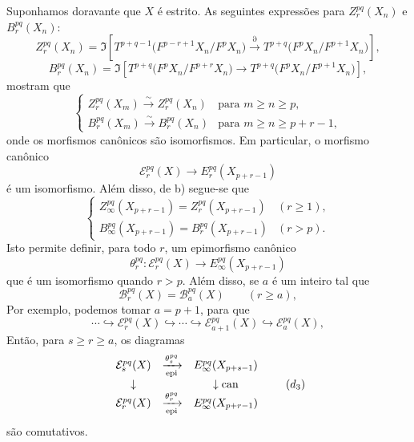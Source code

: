 Suponhamos doravante que \(X\) é estrito. As seguintes expressões para \(Z_r^{pq}(X_n)\) e \(B_r^{pq}(X_n)\):
\[
Z_r^{pq}(X_n)=
\Im\!\left[
T^{p+q-1}\bigl(F^{p-r+1}X_n/F^pX_n\bigr)
\xrightarrow{\partial}
T^{p+q}\bigl(F^pX_n/F^{p+1}X_n\bigr)
\right],
\]
\[
B_r^{pq}(X_n)=
\Im\!\left[
T^{p+q}\bigl(F^pX_n/F^{p+r}X_n\bigr)
\longrightarrow
T^{p+q}\bigl(F^pX_n/F^{p+1}X_n\bigr)
\right],
\]
mostram que
\begin{equation}
\left\{
\begin{array}{ll}
Z_r^{pq}(X_m)\xrightarrow{\sim}Z_r^{pq}(X_n)&\text{para }m\ge n\ge p,\\[3pt]
B_r^{pq}(X_m)\xrightarrow{\sim}B_r^{pq}(X_n)&\text{para }m\ge n\ge p+r-1,
\end{array}
\right.
\tag{\(d_1\)}
\end{equation}
onde os morfismos canônicos são isomorfismos. Em particular, o morfismo canônico
\[
\mathcal E_r^{pq}(X)\longrightarrow E_r^{pq}(X_{p+r-1})
\]
é um isomorfismo. Além disso, de b) segue-se que
\begin{equation}
\left\{
\begin{array}{ll}
Z_\infty^{pq}(X_{p+r-1})=Z_r^{pq}(X_{p+r-1})&(r\ge1),\\[3pt]
B_\infty^{pq}(X_{p+r-1})=B_r^{pq}(X_{p+r-1})&(r>p).
\end{array}
\right.
\tag{\(d_2\)}
\end{equation}
Isto permite definir, para todo \(r\), um epimorfismo canônico
\[
\theta_r^{pq}:\mathcal E_r^{pq}(X)\longrightarrow E_\infty^{pq}(X_{p+r-1})
\]
que é um isomorfismo quando \(r>p\). Além disso, se \(a\) é um inteiro tal que
\[
\mathcal B_r^{pq}(X)=\mathcal B_a^{pq}(X)\qquad(r\ge a),
\]
Por exemplo, podemos tomar \(a=p+1\), para que
\begin{equation}
\cdots\hookrightarrow\mathcal E_r^{pq}(X)\hookrightarrow\cdots\hookrightarrow
\mathcal E_{a+1}^{pq}(X)\hookrightarrow\mathcal E_a^{pq}(X),
\tag{S bis}
\end{equation}
Então, para \(s\ge r\ge a\), os diagramas
\begin{equation}
\begin{array}{ccc}
\mathcal E_s^{pq}(X)&\xrightarrow[\operatorname{epi}]{\theta_s^{pq}}&E_\infty^{pq}(X_{p+s-1})\\
\downarrow&&\downarrow\operatorname{can}\\
\mathcal E_r^{pq}(X)&\xrightarrow[\operatorname{epi}]{\theta_r^{pq}}&E_\infty^{pq}(X_{p+r-1})
\end{array}
\tag{\(d_3\)}
\end{equation}
são comutativos.
